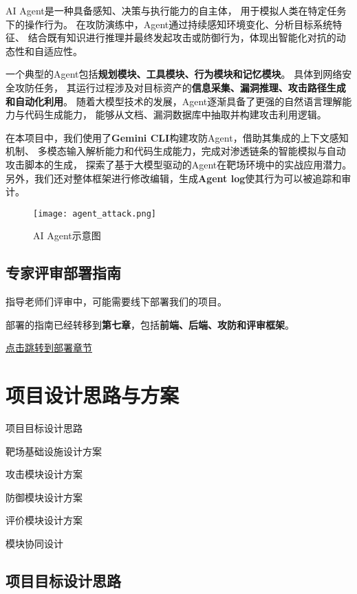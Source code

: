 \documentclass[lang=cn,10pt]{elegantbook}
\begin{document}
AI Agent是一种具备感知、决策与执行能力的自主体，
用于模拟人类在特定任务下的操作行为。
在攻防演练中，Agent通过持续感知环境变化、分析目标系统特征、
结合既有知识进行推理并最终发起攻击或防御行为，体现出智能化对抗的动态性和自适应性。

一个典型的Agent包括\textbf{规划模块、工具模块、行为模块和记忆模块}。
具体到网络安全攻防任务，
其运行过程涉及对目标资产的\textbf{信息采集、漏洞推理、攻击路径生成和自动化利用}。
随着大模型技术的发展，Agent逐渐具备了更强的自然语言理解能力与代码生成能力，
能够从文档、漏洞数据库中抽取并构建攻击利用逻辑。

在本项目中，我们使用了\textbf{Gemini CLI}构建攻防Agent，借助其集成的上下文感知机制、
多模态输入解析能力和代码生成能力，完成对渗透链条的智能模拟与自动攻击脚本的生成，
探索了基于大模型驱动的Agent在靶场环境中的实战应用潜力。
另外，我们还对整体框架进行修改编辑，生成\textbf{Agent log}使其行为可以被追踪和审计。

\begin{figure}[!h]
\centering
\texttt{[image: agent\_attack.png]}  %
\caption{AI Agent示意图}  %
\label{fig:ai_agent}  %
\end{figure}

\section{专家评审部署指南}

指导老师们评审中，可能需要线下部署我们的项目。

部署的指南已经转移到\textbf{第七章}，包括\textbf{前端、后端、攻防和评审框架}。


\hyperlink{chap:deploy}{点击跳转到部署章节}


\chapter{项目设计思路与方案}
\begin{introduction}
  \item 项目目标设计思路
  \item 靶场基础设施设计方案
  \item 攻击模块设计方案
  \item 防御模块设计方案
  \item 评价模块设计方案
  \item 模块协同设计
\end{introduction}
\section{项目目标设计思路}
\end{document}
